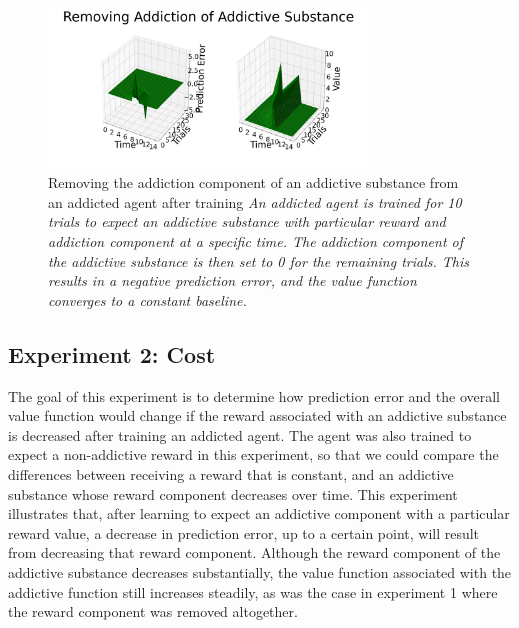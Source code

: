 \documentclass[10pt,letterpaper]{article}
\begin{document}
\begin{figure}[H]
   \centering
    \includegraphics[width = 85mm]{graphs/add_sub_rem.png}
    \caption{Removing the addiction component of an addictive substance from an addicted agent after training
    \newline \emph{An addicted agent is trained for 10 trials to expect an addictive substance with particular reward and addiction component at a specific time. The addiction component of the addictive substance is then set to 0 for the remaining trials. This results in a negative prediction error, and the value function converges to a constant baseline.}}
    \label{fig:Baseline}
\end{figure}


\subsection{Experiment 2: Cost}
The goal of this experiment is to determine how prediction error and the overall value function would change if the reward associated with an addictive substance is decreased after training an addicted agent. The agent was also trained to expect a non-addictive reward in this experiment, so that we could compare the differences between receiving a reward that is constant, and an addictive substance whose reward component decreases over time. This experiment illustrates that, after learning to expect an addictive component with a particular reward value, a decrease in prediction error, up to a certain point, will result from decreasing that reward component. Although the reward component of the addictive substance decreases substantially, the value function associated with the addictive function still increases steadily, as was the case in experiment 1 where the reward component was removed altogether.
\end{document}
